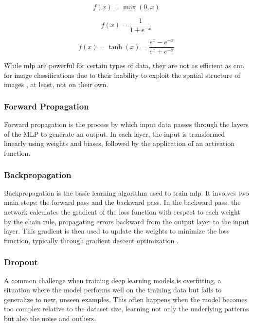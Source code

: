 \begin{equation}
    f(x) = \max(0, x)
    \label{eq:relu}
\end{equation}

\begin{equation}
    f(x) = \frac{1}{1 + e^{-x}}
    \label{eq:sigmoid}
\end{equation}

\begin{equation}
    f(x) = \tanh(x) = \frac{e^x - e^{-x}}{e^x + e^{-x}}
    \label{eq:tanh}
\end{equation}
\smallskip

While \gls{mlp} are powerful for certain types of data, they are not as efficient as \gls{cnn} for
image classifications due to their inability to exploit the spatial structure of images \cite{zhang2021dive},
at least, not on their own.


\subsubsection{Forward Propagation}

Forward propagation is the process by which input data passes through the layers of the
MLP to generate an output. In each layer, the input is transformed linearly using weights
and biases, followed by the application of an activation function.

\subsubsection{Backpropagation}

Backpropagation is the basic learning algorithm used to train \gls{mlp}. It involves two main
steps: the forward pass and the backward pass. In the backward pass, the network
calculates the gradient of the loss function with respect to each weight by the
chain rule, propagating errors backward from the output layer to the input layer.
This gradient is then used to update the weights to minimize the loss function,
typically through gradient descent optimization \cite{zhang2021dive}.

\subsubsection{Dropout}

A common challenge when training deep learning models is overfitting, a 
situation where the model performs well on the training data but fails 
to generalize to new, unseen examples. This often happens when the model
becomes too complex relative to the dataset size, learning not only the underlying 
patterns but also the noise and outliers.

